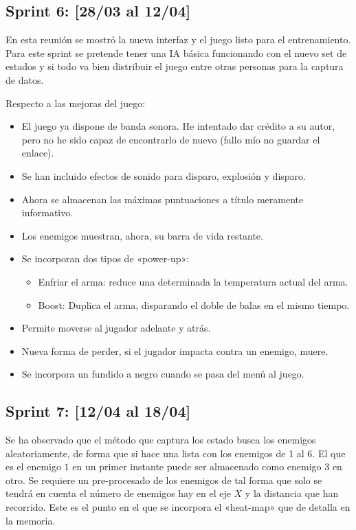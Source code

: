 \subsection{Sprint 6: [28/03 al 12/04]}

En esta reunión se mostró la nueva interfaz y el juego listo para el entrenamiento. Para este sprint se pretende tener una IA básica funcionando con el nuevo set de estados y si todo va bien distribuir el juego entre otras personas para la captura de datos.

Respecto a las mejoras del juego:
\begin{itemize}
    \item El juego ya dispone de banda sonora. He intentado dar crédito a su autor, pero no he sido capaz de encontrarlo de nuevo (fallo mío no guardar el enlace).
    \item Se han incluido efectos de sonido para disparo, explosión y disparo.
    \item Ahora se almacenan las máximas puntuaciones a título meramente informativo.
    \item Los enemigos muestran, ahora, su barra de vida restante.
    \item Se incorporan dos tipos de «power-up»:
    \begin{itemize}
        \item Enfriar el arma: reduce una determinada la temperatura actual del arma.
        \item Boost: Duplica el arma, disparando el doble de balas en el mismo tiempo.
    \end{itemize}
    \item Permite moverse al jugador adelante y atrás.
    \item Nueva forma de perder, si el jugador impacta contra un enemigo, muere.
    \item Se incorpora un fundido a negro cuando se pasa del menú al juego.
\end{itemize}



\subsection{Sprint 7:  [12/04 al 18/04]}

Se ha observado que el método que captura los estado busca los enemigos aleatoriamente, de forma que si hace una lista con los enemigos de 1 al 6. El que es el enemigo $1$ en un primer instante puede ser almacenado como enemigo $3$ en otro. Se requiere un pre-procesado de los enemigos de tal forma que solo se tendrá en cuenta el número de enemigos hay en el eje $X$ y la distancia que han recorrido. Este es el punto en el que se incorpora el «heat-map» que de detalla en la memoria.

